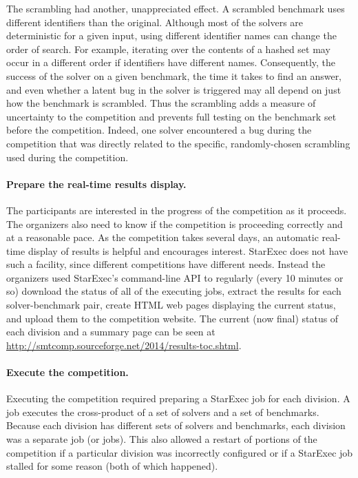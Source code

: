 \documentclass[twoside,11pt]{article}
\begin{document}
The scrambling had another, unappreciated effect. A scrambled benchmark uses different identifiers than the original. Although most of the solvers are deterministic for a given input, using different identifier names can change the order of search. For example, iterating over the contents of a hashed set may occur in a different order if identifiers have different names. Consequently, the success of the solver on a given benchmark, the time it takes to find an answer, and even whether a latent bug in the solver is triggered may all depend on just how the benchmark is scrambled. Thus the scrambling adds a measure of uncertainty to the competition and prevents full testing on the benchmark set before the competition. Indeed, one solver encountered a bug during the competition that was directly related to the specific, randomly-chosen scrambling used during the competition.

\paragraph{Prepare the real-time results display.} The participants are interested in the progress of the competition as it proceeds. The organizers also need to know if the competition is proceeding correctly and at a reasonable pace. As the competition takes several days, an automatic real-time display of results is helpful and encourages interest.  StarExec does not have such a facility, since different competitions have different needs. Instead the organizers used StarExec's command-line API to regularly (every 10 minutes or so) download the status of all of the executing jobs, extract the results for each solver-benchmark pair, create HTML web pages displaying the current status, and upload them to the competition website. The current (now final) status of each division and a summary page can be seen at 
\url{http://smtcomp.sourceforge.net/2014/results-toc.shtml}.

\paragraph{Execute the competition.} Executing the competition required preparing a StarExec job for each 
division. A job executes the cross-product of a set of solvers and a set of benchmarks. Because each division has different sets of solvers and benchmarks, each division was a separate job (or jobs). This also allowed a restart of portions of the competition if a particular division was incorrectly configured or if a StarExec job stalled for some reason (both of which happened).
\end{document}
